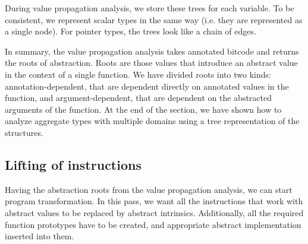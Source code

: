 \begin{example}
\begin{center}
\begin{minipage}[t]{.47\textwidth}
\end{minipage}
\end{center}
\end{example}

During value propagation analysis, we store these trees for each variable.
To be consistent, we represent scalar types in the same way (i.e. they are
represented as a single node). For pointer types, the trees look like a chain of
 edges.

\begin{summary}
In summary, the value propagation analysis takes annotated \LLVM bitcode and
returns the roots of abstraction. Roots are those \LLVM values that introduce an
abstract value in the context of a single function. We have divided roots into two
kinds: annotation-dependent, that are dependent directly on annotated values
in the function, and argument-dependent, that are dependent
on the abstracted arguments of the function. At the end of the section, we
have shown how to analyze aggregate types with multiple domains using a tree
representation of the structures.
\end{summary}

\subsection{Lifting of instructions}
Having the abstraction roots from the value propagation analysis, we can
start program transformation. In this \LLVM pass, we want all the instructions
that work with abstract values to be replaced by abstract intrinsics.
Additionally, all the required function prototypes have to be created, and
appropriate abstract implementation inserted into them.

